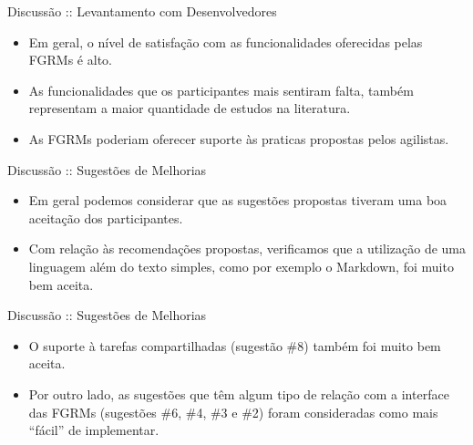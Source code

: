 \documentclass[t,14pt,mathserif]{beamer}
\begin{document}
\begin{frame}{Discussão :: Levantamento com Desenvolvedores}
    \begin{itemize}
        \item Em geral, o nível de satisfação com as funcionalidades oferecidas
            pelas FGRMs é alto.

        \item As funcionalidades que os
            participantes mais sentiram falta, também representam a maior
            quantidade de estudos na literatura.

        \item As FGRMs poderiam oferecer suporte às praticas propostas pelos
            agilistas.

    \end{itemize}
\end{frame}

\begin{frame}{Discussão :: Sugestões de Melhorias}
    \begin{itemize}
        \item Em geral podemos considerar que as sugestões propostas tiveram uma
            boa aceitação dos participantes.
        \item Com relação às recomendações propostas, verificamos que a
            utilização de uma linguagem além do texto simples, como por exemplo
            o Markdown, foi muito bem aceita.
    \end{itemize}
\end{frame}

\begin{frame}{Discussão :: Sugestões de Melhorias}
    \begin{itemize}

        \item O suporte à tarefas compartilhadas (sugestão \#8) também foi muito
            bem aceita.

        \item Por outro lado, as sugestões que têm algum tipo de relação com a
              interface das FGRMs (sugestões \#6, \#4, \#3 e \#2) foram
              consideradas como mais ``fácil'' de implementar.

    \end{itemize}
\end{frame}
\end{document}

